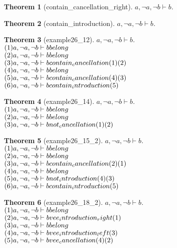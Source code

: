 \documentclass[11pt]{article}
\newtheorem{theorem}{Theorem}
\def\turn{\vdash}
\begin{document}
\begin{theorem}[contain_cancellation_right] $ a, \neg a, \neg b \turn b $.\\
\end{theorem}
\begin{theorem}[contain_introduction] $ a, \neg a, \neg b \turn b $.\\
\end{theorem}
\begin{theorem}[example26_12] $ a, \neg a, \neg b \turn b $.\\
$(1)a, \neg a, \neg b \turn b \hfill belong  $\\
$(2)a, \neg a, \neg b \turn b \hfill belong  $\\
$(3)a, \neg a, \neg b \turn b \hfill contain_cancellation (1)(2) $\\
$(4)a, \neg a, \neg b \turn b \hfill belong  $\\
$(5)a, \neg a, \neg b \turn b \hfill contain_cancellation (4)(3) $\\
$(6)a, \neg a, \neg b \turn b \hfill contain_introduction (5) $\\
\end{theorem}
\begin{theorem}[example26_14] $ a, \neg a, \neg b \turn b $.\\
$(1)a, \neg a, \neg b \turn b \hfill belong  $\\
$(2)a, \neg a, \neg b \turn b \hfill belong  $\\
$(3)a, \neg a, \neg b \turn b \hfill not_cancellation (1)(2) $\\
\end{theorem}
\begin{theorem}[example26_15_2] $ a, \neg a, \neg b \turn b $.\\
$(1)a, \neg a, \neg b \turn b \hfill belong  $\\
$(2)a, \neg a, \neg b \turn b \hfill belong  $\\
$(3)a, \neg a, \neg b \turn b \hfill contain_cancellation (2)(1) $\\
$(4)a, \neg a, \neg b \turn b \hfill belong  $\\
$(5)a, \neg a, \neg b \turn b \hfill not_introduction (4)(3) $\\
$(6)a, \neg a, \neg b \turn b \hfill contain_introduction (5) $\\
\end{theorem}
\begin{theorem}[example26_18_2] $ a, \neg a, \neg b \turn b $.\\
$(1)a, \neg a, \neg b \turn b \hfill belong  $\\
$(2)a, \neg a, \neg b \turn b \hfill vee_introduction_right (1) $\\
$(3)a, \neg a, \neg b \turn b \hfill belong  $\\
$(4)a, \neg a, \neg b \turn b \hfill vee_introduction_left (3) $\\
$(5)a, \neg a, \neg b \turn b \hfill vee_cancellation (4)(2) $\\
\end{theorem}
\end{document}
